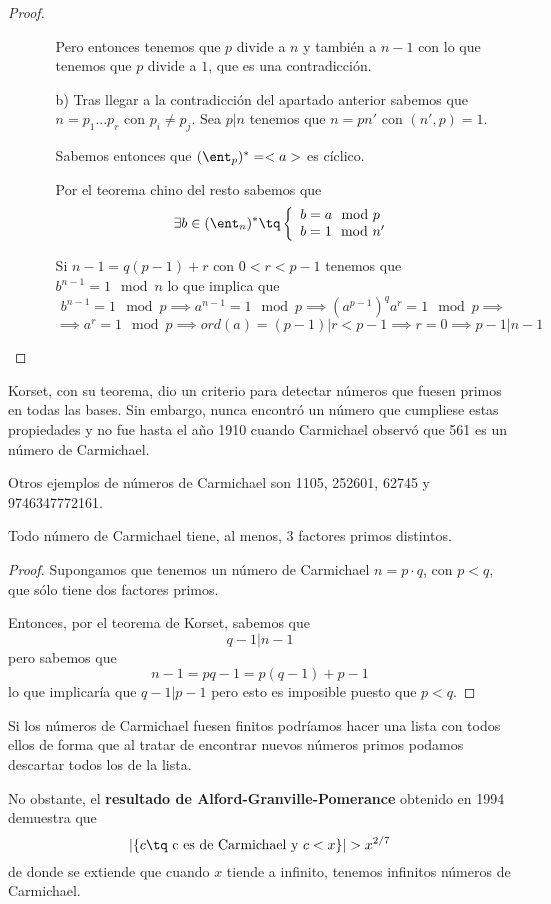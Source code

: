 \begin{proof}
\begin{itemize}
\begin{itemize}
Pero entonces tenemos que $p$ divide a $n$ y también a $n-1$ con lo que tenemos que $p$ divide a $1$, que es una contradicción.

\item[b)]
Tras llegar a la contradicción del apartado anterior sabemos que $n=p_1...p_r$ con $p_i \neq p_j$. Sea $p | n$ tenemos que $n=pn'$ con $(n',p)=1$.

Sabemos entonces que $(\ent_p)^*=<a>$ es cíclico.

Por el teorema chino del resto sabemos que
\[\exists b \in (\ent_n)^* \tq \left\{\begin{array}{l}b=a\mod p \\ b=1 \mod n' \end{array}\right.\]

Si $n-1 = q(p-1)+r$ con $0 < r < p-1$ tenemos que $b^{n-1}=1 \mod n$ lo que implica que
\[b^{n-1}=1 \mod p \implies a^{n-1} = 1 \mod p \implies (a^{p-1})^qa^r = 1 \mod p \implies\]
\[\implies a^r = 1 \mod p \implies ord(a) = (p-1)|r<p-1 \implies r=0\implies p-1 | n-1\]
\end{itemize}
\end{itemize}
\end{proof}

Korset, con su teorema, dio un criterio para detectar números que fuesen primos en todas las bases. Sin embargo, nunca encontró un número que cumpliese estas propiedades y no fue hasta el año 1910 cuando Carmichael observó que 561 es un número de Carmichael.

Otros ejemplos de números de Carmichael son 1105, 252601, 62745 y 9746347772161.

\begin{prop}
Todo número de Carmichael tiene, al menos, 3 factores primos distintos.
\end{prop}
\begin{proof}
Supongamos que tenemos un número de Carmichael $n=p\cdot q$, con $p<q$, que sólo tiene dos factores primos.

Entonces, por el teorema de Korset, sabemos que
\[q-1 | n-1\]
pero sabemos que
\[n-1 =pq-1=p(q-1)+p-1\]
lo que implicaría que $q-1|p-1$ pero esto es imposible puesto que $p<q$.
\end{proof}

Si los números de Carmichael fuesen finitos podríamos hacer una lista con todos ellos de forma que al tratar de encontrar nuevos números primos podamos descartar todos los de la lista.

No obstante, el \textbf{resultado de Alford-Granville-Pomerance} obtenido en 1994 demuestra que
\[|\{c \tq \text{ c es de Carmichael y } c < x\}| > x^{2/7}\]
de donde se extiende que cuando $x$ tiende a infinito, tenemos infinitos números de Carmichael.

